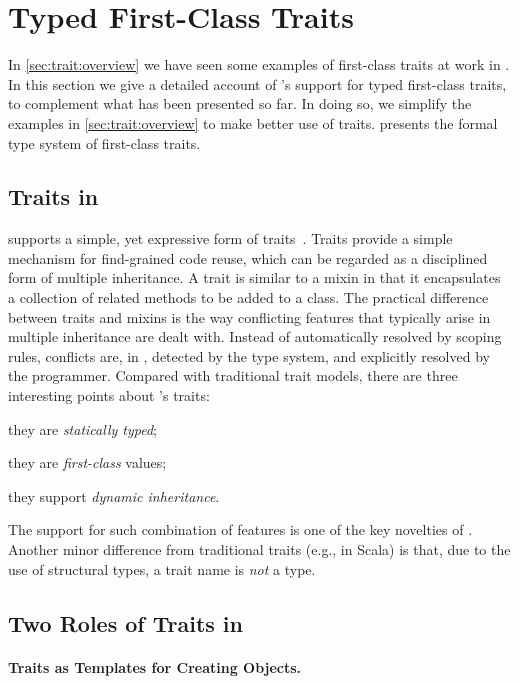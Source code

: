 \section{Typed First-Class Traits}
\label{sec:traits}

In \cref{sec:trait:overview} we have seen some examples of first-class traits at work
in \sedel. In this section we give a detailed account of \sedel's support for
typed first-class traits, to complement what has been presented so far. In doing so,
we simplify the examples in \cref{sec:trait:overview} to make better use of traits.
 presents the formal type system of first-class traits.

\subsection{Traits in \sedel}

\sedel supports a simple, yet expressive form of traits~\citep{scharli2003traits}.
Traits provide a simple mechanism for find-grained code reuse, which
can be regarded as a disciplined form of multiple inheritance. A trait is
similar to a mixin in that it encapsulates a collection of related methods to be
added to a class. The
practical difference between traits and mixins is the way conflicting features
that typically arise in multiple inheritance are dealt with. Instead of
automatically resolved by scoping rules, conflicts are, in \sedel,
detected by the type system, and explicitly resolved by the programmer. Compared
with traditional trait models, there are three interesting points about
\sedel's traits:
\begin{inparaenum}[(1)]
\item they are \emph{statically typed};
\item they are \emph{first-class} values;
\item they support \emph{dynamic inheritance}.
\end{inparaenum}
The support for such combination of features is one of the key novelties of \sedel.
Another minor difference from traditional traits (e.g., in Scala) is that,
due to the use of structural types, a trait name is \textit{not} a type.

\subsection{Two Roles of Traits in \sedel}

\paragraph{Traits as Templates for Creating Objects.}

